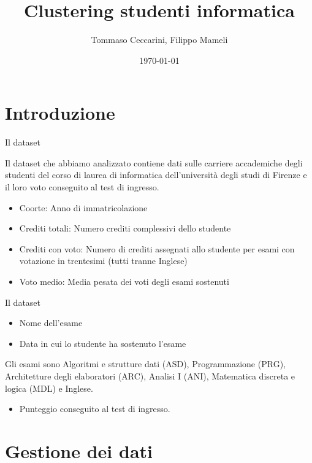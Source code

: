 \documentclass{beamer}
\title{Clustering studenti informatica}
\date{\today}
\author{Tommaso Ceccarini, Filippo Mameli}
\begin{document}
        
    \maketitle

    \section{Introduzione}
    
    \begin{frame}{Il dataset}

        Il dataset che abbiamo analizzato contiene dati sulle carriere accademiche degli studenti del corso di laurea di informatica dell'università degli studi di Firenze e il loro voto conseguito 
        al test di ingresso.
        \begin{itemize}
            \item Coorte: Anno di immatricolazione
            \item Crediti totali: Numero crediti complessivi dello studente
            \item Crediti con voto: Numero di crediti assegnati allo studente per esami con votazione in trentesimi (tutti tranne Inglese)
            \item Voto medio: Media pesata dei voti degli esami sostenuti
        \end{itemize}
    \end{frame}

    \begin{frame}{Il dataset}
        \begin{itemize}
            \item Nome dell'esame
            \item Data in cui lo studente ha sostenuto l'esame
        \end{itemize}
        Gli esami sono Algoritmi e strutture dati (ASD), Programmazione (PRG), Architetture degli elaboratori (ARC), Analisi I (ANI), Matematica discreta e logica (MDL) e Inglese.
        \begin{itemize}
            \item Punteggio conseguito al test di ingresso.
        \end{itemize}
    \end{frame}

    \section{Gestione dei dati}
\end{document}
